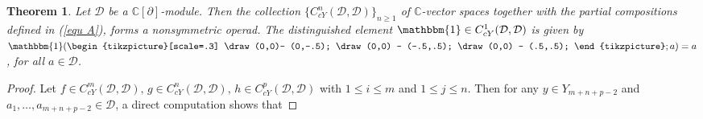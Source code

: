 \documentclass[a4paper,reqno,10pt]{amsart}
\theoremstyle{plain}
\newtheorem{thm}{Theorem}[section]
\theoremstyle{definition}
\theoremstyle{remark}
\newcommand{\C}{\mathbb{C}}
\newcommand{\D}{\mathcal{D}}
\newcommand{\p}{\partial}
\begin{document}
 \begin{thm}\label{thm-operad}
     Let $\D$ be a $\C[\p]$-module. Then the collection $\{C_{cY}^{n}(\D,\D)\}_{n \geq 1}$ of $\C$-vector spaces together with the partial compositions defined in (\ref{equ A}), forms a nonsymmetric operad. The distinguished element $\mathbbm{1} \in C_{cY}^{1}(\D,\D)$ is given by 
     $\mathbbm{1}( \begin{tikzpicture}[scale=.3]
\draw (0,0)-- (0,-.5); \draw (0,0) -- (-.5,.5); \draw (0,0) -- (.5,.5);
\end{tikzpicture};a) =a$, for all $a \in \D$. 
 \end{thm}
        
\begin{proof}
Let $f \in C_{cY}^{m}(\D,\D), \, g \in C_{cY}^{n}(\D,\D), \, h \in C_{cY}^{p}(\D,\D)$  with $1 \leq i \leq m $ and $1 \leq j \leq n$. Then for any $y \in Y_{m+n+p-2}$ and $a_1, \ldots, a_{m+n+p-2} \in \D$, a direct computation shows that


\end{proof}
\end{document}

